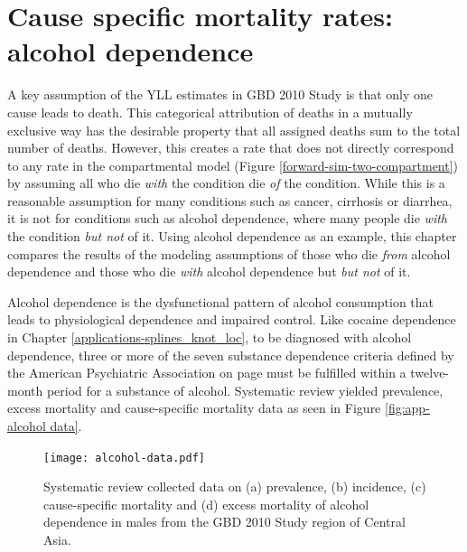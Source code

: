 \chapter{Cause specific mortality rates: alcohol dependence}
\label{applications-csmr}

A key assumption of the YLL estimates in GBD 2010 Study is that only
one cause leads to death.  This categorical attribution of deaths in
a mutually exclusive way has the desirable property that all assigned
deaths sum to the total number of deaths.  However, this
creates a rate that does not directly correspond to any rate in the
compartmental model (Figure \ref{forward-sim-two-compartment}) by
assuming all who die \emph{with} the condition die \emph{of} the
condition.  While this is a reasonable assumption for many conditions
such as cancer, cirrhosis or diarrhea, it is not for conditions such as
alcohol dependence, where many people die \emph{with}
the condition \emph{but not} of it.  Using alcohol dependence as an
example, this chapter compares the results of
the modeling assumptions of those who die \emph{from} alcohol dependence
and those who die \emph{with} alcohol dependence but \emph{but not} of it.

Alcohol dependence is the dysfunctional pattern of alcohol consumption
that leads to physiological dependence and impaired control.  Like
cocaine dependence in Chapter \ref{applications-splines_knot_loc}, to
be diagnosed with alcohol dependence, three or more of the seven
substance dependence criteria defined by the American Psychiatric
Association on page \pageref{page:app-substance_dependence} must be
fulfilled within a twelve-month period for a substance of alcohol.
\cite{american_psychiatric_association_diagnostic_2000, hasin_prevalence_2007}
Systematic review yielded prevalence, excess mortality and
cause-specific mortality data as seen in Figure \ref{fig:app-alcohol
  data}.

    \begin{figure}[h]
        \begin{center}
            \texttt{[image: alcohol-data.pdf]}
            \caption{Systematic review collected data on (a) prevalence,
              (b) incidence, (c) cause-specific mortality and (d) excess
              mortality of alcohol dependence in males from the GBD 2010
              Study region of Central Asia.}
            \label{fig:app-alcohol data}
        \end{center}
    \end{figure}

